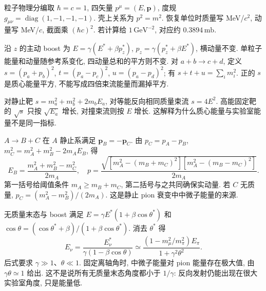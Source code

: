 \label{ch:kinematics}
粒子物理分编取 $\hbar=c=1$, 四矢量 $p^\mu=(E,\mathbf p)$, 度规 $g_{\mu\nu}=\operatorname{diag}(1,-1,-1,-1)$. 壳上关系为 $p^2=m^2$. 恢复单位时质量写 MeV/$c^2$, 动量写 MeV/$c$, 截面乘 $(\hbar c)^2$. 若计算给 $1\,\mathrm{GeV}^{-2}$, 对应约 $0.3894\,\mathrm{mb}$.

沿 $z$ 的主动 boost 为 $E=\gamma(E^*+\beta p_z^*)$, $p_z=\gamma(p_z^*+\beta E^*)$, 横动量不变. 单粒子能量和动量随参考系变化, 四动量总和的平方则不变. 对 $a+b\to c+d$, 定义 $s=(p_a+p_b)^2$, $t=(p_a-p_c)^2$, $u=(p_a-p_d)^2$; 有 $s+t+u=\sum_i m_i^2$. 正的 $s$ 是质心能量平方, 不能写成四倍束流能量而漏掉平方.

对静止靶 $s=m_a^2+m_b^2+2m_bE_a$, 对等能反向相同质量束流 $s=4E^2$. 高能固定靶的 $\sqrt s$ 只按 $\sqrt{E_a}$ 增长, 对撞束流则按 $E$ 增长. 这解释为什么质心能量与实验室能量不是同一指标.

$A\to B+C$ 在 $A$ 静止系满足 $\mathbf p_B=-\mathbf p_C$. 由 $p_C=p_A-p_B$, $m_C^2=m_A^2+m_B^2-2m_AE_B$, 得
\begin{equation}\label{eq:two-body}
 E_B=\frac{m_A^2+m_B^2-m_C^2}{2m_A},\quad
 p=\frac{\sqrt{[m_A^2-(m_B+m_C)^2][m_A^2-(m_B-m_C)^2]}}{2m_A}.
\end{equation}
第一括号给阈值条件 $m_A\ge m_B+m_C$, 第二括号与之共同确保实动量. 若 $C$ 无质量, $p_C=(m_A^2-m_B^2)/(2m_A)$. 这是静止 pion 衰变中中微子能量的来源.

无质量末态与 boost 满足 $E=\gamma E^*(1+\beta\cos\theta^*)$ 和
$\cos\theta=(\cos\theta^*+\beta)/(1+\beta\cos\theta^*)$. 消去 $\theta^*$ 得
\begin{equation}\label{eq:offaxis}
 E_\nu=\frac{E_\nu^*}{\gamma(1-\beta\cos\theta)}
 \simeq\frac{(1-m_\mu^2/m_\pi^2)E_\pi}{1+\gamma^2\theta^2}.
\end{equation}
后式要求 $\gamma\gg1$、$\theta\ll1$. 固定离轴角时, 中微子能量对 pion 能量存在极大值, 由 $\gamma\theta\simeq1$ 给出. 这不是说所有无质量末态角度都小于 $1/\gamma$: 反向发射仍能出现在很大实验室角度, 只是能量低.

